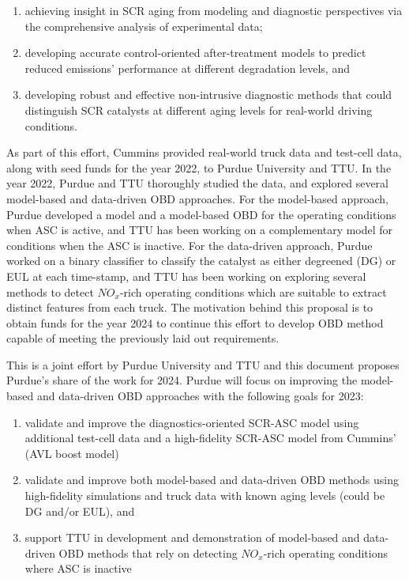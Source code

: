 \documentclass[letterpaper, 11pt]{article}
\begin{document}
\begin{enumerate}
\item achieving insight in SCR aging from modeling and diagnostic perspectives
via the comprehensive analysis of experimental data;
\item developing accurate control-oriented after-treatment models to predict
reduced emissions' performance at different degradation levels, and
\item developing robust and effective non-intrusive diagnostic methods that could distinguish SCR catalysts at different aging levels for real-world driving conditions.
\end{enumerate}

As part of this effort, Cummins provided real-world truck data and test-cell
data, along with seed funds for the year 2022, to Purdue University and TTU. In
the year 2022, Purdue and TTU thoroughly studied the data, and explored several
model-based and data-driven OBD approaches. For the model-based approach,
Purdue developed a model and a model-based OBD for the operating conditions
when ASC is active, and TTU has been working on a complementary model for
conditions when the ASC is inactive. For the data-driven approach, Purdue
worked on a binary classifier to classify the catalyst as either degreened (DG)
or EUL at each time-stamp, and TTU has been working on exploring several
methods to detect $NO_x$-rich operating conditions which are suitable to
extract distinct features from each truck. The motivation behind this proposal
is to obtain funds for the year 2024 to continue this effort to develop OBD
method capable of meeting the previously laid out requirements.

This is a joint effort by Purdue University and TTU and this document proposes
Purdue's share of the work for 2024. Purdue will focus on improving the
model-based and data-driven OBD approaches with the following goals for 2023:
\begin{enumerate}
\item validate and improve the diagnostics-oriented SCR-ASC model using
additional test-cell data and a high-fidelity SCR-ASC model from Cummins' (AVL
boost model)
\item validate and improve both model-based and data-driven OBD methods using
high-fidelity simulations and truck data with known aging levels (could be DG
and/or EUL), and
\item  support TTU in development and demonstration of model-based and data-driven OBD methods that rely on detecting $NO_x$-rich operating conditions where ASC is inactive
\end{enumerate}
\end{document}
